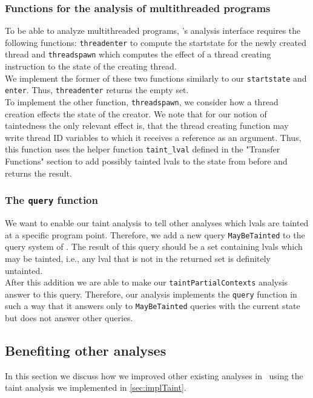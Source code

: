       \subsubsection{Functions for the analysis of multithreaded programs}
        To be able to analyze multithreaded programs, \gob's analysis interface requires the following functions: \texttt{threadenter} to compute the startstate for the newly created thread and \texttt{threadspawn} which computes the effect of a thread creating instruction to the state of the creating thread.\\
        We implement the former of these two functions similarly to our \texttt{startstate} and \texttt{enter}. Thus, \texttt{threadenter} returns the empty set.\\
        To implement the other function, \texttt{threadspawn}, we consider how a thread creation effects the state of the creator. We note that for our notion of taintedness the only relevant effect is, that the thread creating function may write thread ID variables to which it receives a reference as an argument. Thus, this function uses the helper function \texttt{taint\_lval} defined in the "Transfer Functions" section to add possibly tainted \ac{lval}s to the state from before and returns the result.

      \subsubsection{The \texttt{query} function}
        We want to enable our taint analysis to tell other analyses which \ac{lval}s are tainted at a specific program point. Therefore, we add a new query \texttt{MayBeTainted} to the query system of \gob. The result of this query should be a set containing \ac{lval}s which may be tainted, i.e., any \ac{lval} that is not in the returned set is definitely untainted.\\
        After this addition we are able to make our \texttt{taintPartialContexts} analysis answer to this query. Therefore, our analysis implements the \texttt{query} function in such a way that it answers only to \texttt{MayBeTainted} queries with the current state but does not answer other queries.

    \subsection{Benefiting other analyses}\label{sec:improveVariableAnalyses}
    In this section we discuss how we improved other existing analyses in \gob\ using the taint analysis we implemented in \autoref{sec:implTaint}.
